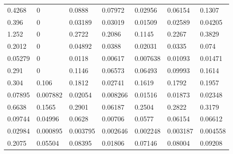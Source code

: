 \documentclass[11pt,a4paper]{article}
\numberwithin{equation}{section}
\begin{document}
\begin{table}[]
\begin{tabular}{lllllll}
0.4268  & 0		   & 0.0888   & 0.07972       & 0.02956      & 0.06154      & 0.1307         \\
0.396   & 0  	   & 0.03189  & 0.03019       & 0.01509      & 0.02589      & 0.04205      \\
1.252   & 0        & 0.2722   & 0.2086        & 0.1145       & 0.2267       & 0.3829       \\
0.2012  & 0        & 0.04892  & 0.0388        & 0.02031      & 0.0335       & 0.074        \\
0.05279 & 0  	   & 0.0118   & 0.00617       & 0.007638     & 0.01093      & 0.01471      \\
0.291   & 0		   & 0.1146   & 0.06573       & 0.06493      & 0.09993      & 0.1614       \\
0.304   & 0.106    & 0.1812   & 0.02741       & 0.1619       & 0.1792       & 0.1957       \\
0.07895 & 0.007882 & 0.02054  & 0.008266      & 0.01516      & 0.01873      & 0.02348      \\
0.6638  & 0.1565   & 0.2901   & 0.06187       & 0.2504       & 0.2822       & 0.3179       \\
0.09744 & 0.04996  & 0.0628   & 0.00706       & 0.0577       & 0.06154      & 0.06612      \\
0.02984 & 0.000895 & 0.003795 & 0.002646      & 0.002248     & 0.003187     & 0.004558     \\
0.2075  & 0.05504  & 0.08395  & 0.01806       & 0.07146      & 0.08004      & 0.09208     
\end{tabular}
\end{table}
\end{document}
